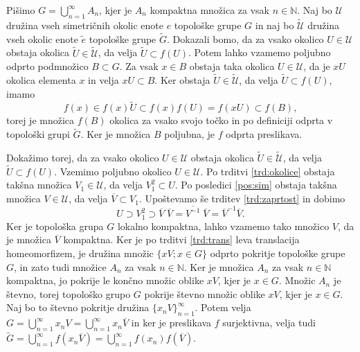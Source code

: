 \documentclass[mat1]{fmfdelo}
\newcommand{\N}{\mathbb N}
\newcommand{\Ucurl}{\mathcal{U}}
\newcommand{\closure}[1]{\overline{#1}}
\begin{document}
\begin{dokaz}
Pišimo $G = \bigcup_{n=1}^\infty A_n$, kjer je $A_n$ kompaktna množica za vsak $n \in \N$. Naj bo $\Ucurl$ družina vseh simetričnih okolic enote $e$ topološke grupe $G$ in naj bo $\widetilde{\Ucurl}$ družina vseh okolic enote $\tilde{e}$ topološke grupe $\widetilde{G}$. Dokazali bomo, da za vsako okolico $U \in \Ucurl$ obstaja okolica $\widetilde{U} \in \widetilde{\Ucurl}$, da velja $\widetilde{U} \subset f(U)$. Potem lahko vzamemo poljubno odprto podmnožico $B \subset G$. Za vsak $x \in B$ obstaja taka okolica $U \in \Ucurl$, da je $xU$ okolica elementa $x$ in velja $xU \subset B$. Ker obstaja $\widetilde{U} \in \widetilde{\Ucurl}$, da velja $\widetilde{U} \subset f(U)$, imamo
\[ f(x) \in f(x)\widetilde{U} \subset f(x)f(U) = f(xU) \subset f(B), \]
torej je množica $f(B)$ okolica za vsako svojo točko in po definiciji odprta v topološki grupi $\widetilde{G}$. Ker je množica $B$ poljubna, je $f$ odprta preslikava.

Dokažimo torej, da za vsako okolico $U \in \Ucurl$ obstaja okolica $\widetilde{U} \in \widetilde{\Ucurl}$, da velja $\widetilde{U} \subset f(U)$. Vzemimo poljubno okolico $U \in \Ucurl$. Po trditvi \ref{trd:okolice} obstaja takšna množica $V_1 \in \Ucurl$, da velja $V_1^2 \subset U$. Po posledici \ref{pos:sim} obstaja takšna množica $V \in \Ucurl$, da velja $\closure{V} \subset V_1$. Upoštevamo še trditev \ref{trd:zaprtost} in dobimo
\[ U \supset V_1^2 \supset \closure{V}\;\closure{V} = \closure{V^{-1}}\;\closure{V} = \closure{V}^{-1}\closure{V}. \]
Ker je topološka grupa $G$ lokalno kompaktna, lahko vzamemo tako množico $V$, da je množica $\closure{V}$ kompaktna.
Ker je po trditvi \ref{trd:trans} leva translacija homeomorfizem, je družina množic $\lbrace xV ; x \in G \rbrace$ odprto pokritje topološke grupe $G$, in zato tudi množice $A_n$ za vsak $n \in \N$. Ker je množica $A_n$ za vsak $n \in \N$ kompaktna, jo pokrije le končno množic oblike $xV$, kjer je $x \in G$. Množic $A_n$ je števno, torej topološko grupo $G$ pokrije števno množic oblike $xV$, kjer je $x \in G$. Naj bo to števno pokritje družina $\lbrace x_nV \rbrace_{n=1}^\infty$. Potem velja $G = \bigcup_{n=1}^\infty x_nV = \bigcup_{n=1}^\infty x_n\closure{V}$ in ker je preslikava $f$ surjektivna, velja tudi $\widetilde{G} = \bigcup_{n=1}^\infty f(x_n\closure{V}) = \bigcup_{n=1}^\infty f(x_n)f(\closure{V})$.


\end{dokaz}
\end{document}
